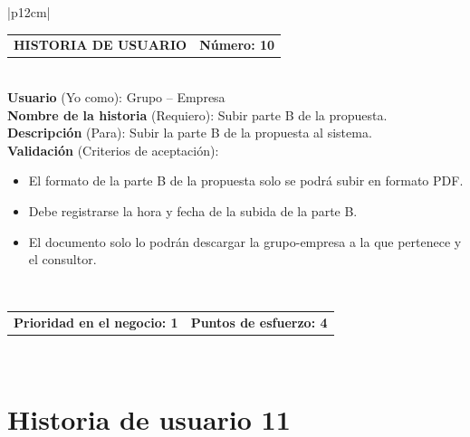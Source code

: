 \documentclass[11pt,letterpaper]{report}
\begin{document}
	\begin{center}	
		\begin{tabular}{|p{12cm}|}
			\hline
			\begin{tabular}{c|c}
				\textbf{HISTORIA DE USUARIO} & \textbf{Número: 10} \\
			\end{tabular} \\ \hline
			\textbf{Usuario} (Yo como): Grupo – Empresa \\ \hline
			\textbf{Nombre de la historia} (Requiero): Subir parte B de la propuesta.  \\ \hline
			\textbf{Descripción} (Para): Subir la parte B de la propuesta al
			sistema. \\ \hline
			\textbf{Validación} (Criterios de aceptación): \\
			\begin{minipage}{12cm}
				\begin{itemize}
					\item El formato de la parte B de la propuesta solo se podrá subir en formato PDF.
					\item Debe registrarse la hora y fecha de la subida de la parte B.
					\item El documento solo lo podrán descargar la grupo-empresa a la que pertenece y el consultor.
				\end{itemize}
			\end{minipage} \\ \hline
			\begin{tabular}{c|c}
				\textbf{Prioridad en el negocio: 1} & \textbf{Puntos de esfuerzo: 4} \\
			\end{tabular} \\ \hline
		\end{tabular}
	\end{center}
	
	\section{Historia de usuario 11}
	
\end{document}

